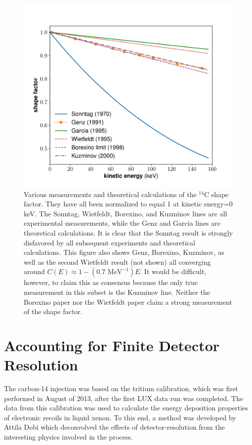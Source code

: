 \begin{figure}[h!]
\centering
\includegraphics[width=\textwidth]{Figures/ShapeFac_compare.pdf}
\caption{Various measurements and theoretical calculations of the $^{14}$C shape factor. They have all been normalized to equal 1 at kinetic energy=0 keV. The Sonntag\cite{C14_Sonntag}, Wietfeldt\cite{C14_Wietfeldt}, Borexino\cite{C14_Borexino}, and Kuzminov\cite{C14_Kuzminov} lines are all experimental measurements, while the Genz\cite{C14_Genz} and Garcia\cite{C14_Garcia} lines are theoretical calculations. It is clear that the Sonntag result is strongly disfavored by all subsequent experiments and theoretical calculations. This figure also shows Genz, Borexino, Kuzminov, as well as the second Wietfeldt result (not shown) all converging around $C(E)\approx 1-(0.7 \text{ \ MeV}^{-1})E$. It would be difficult, however, to claim this as consensus because the only true measurement in this subset is the Kuzminov line. Neither the Borexino paper nor the Wietfeldt paper claim a strong measurement of the shape factor.} 
\label{fig:C14_shape}
\end{figure}



\section{Accounting for Finite Detector Resolution}\label{sec:desmearing}
The carbon-14 injection was based on the tritium calibration, which was first performed in August of 2013, after the first LUX data run was completed. The data from this calibration was used to calculate the energy deposition properties of electronic recoils in liquid xenon. To this end, a method was developed by Attila Dobi which deconvolved the effects of detector-resolution from the interesting physics involved in the process\cite{lux_tritium,attila}. 


